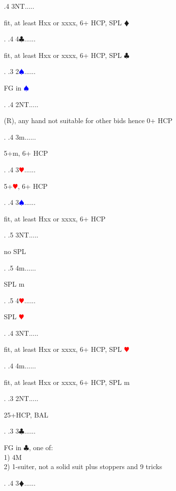\documentclass[a4paper]{article}
\newcommand{\BC}{\textcolor{OliveGreen}{$\clubsuit$}}
\newcommand{\BD}{\textcolor{RedOrange}{$\vardiamondsuit$}}
\newcommand{\BH}{\textcolor{Red}{$\varheartsuit${}}}
\newcommand{\BS}{\textcolor{Blue}{$\spadesuit${}}}
\begin{document}
{ .4 3NT.....\begin{minipage}[t]{0.8\textwidth}
fit, at least Hxx or xxxx, 6+ HCP, SPL \BD 
\end{minipage}. 
 .4 4\BC......\begin{minipage}[t]{0.8\textwidth}
fit, at least Hxx or xxxx, 6+ HCP, SPL \BC 
\end{minipage}. 
 .3 2\BS......\begin{minipage}[t]{0.8\textwidth}
FG in \BS 
\end{minipage}. 
 .4 2NT.....\begin{minipage}[t]{0.8\textwidth}
(R), any hand not suitable for other bids hence 0+ HCP
\end{minipage}. 
 .4 3m......\begin{minipage}[t]{0.8\textwidth}
5+m, 6+ HCP
\end{minipage}. 
 .4 3\BH......\begin{minipage}[t]{0.8\textwidth}
5+\BH , 6+ HCP
\end{minipage}. 
 .4 3\BS......\begin{minipage}[t]{0.8\textwidth}
fit, at least Hxx or xxxx, 6+ HCP
\end{minipage}. 
 .5 3NT.....\begin{minipage}[t]{0.8\textwidth}
no SPL
\end{minipage}. 
 .5 4m......\begin{minipage}[t]{0.8\textwidth}
SPL m
\end{minipage}. 
 .5 4\BH......\begin{minipage}[t]{0.8\textwidth}
SPL \BH 
\end{minipage}. 
 .4 3NT.....\begin{minipage}[t]{0.8\textwidth}
fit, at least Hxx or xxxx, 6+ HCP, SPL \BH 
\end{minipage}. 
 .4 4m......\begin{minipage}[t]{0.8\textwidth}
fit, at least Hxx or xxxx, 6+ HCP, SPL m
\end{minipage}. 
 .3 2NT.....\begin{minipage}[t]{0.8\textwidth}
25+HCP, BAL
\end{minipage}. 
 .3 3\BC......\begin{minipage}[t]{0.8\textwidth}
FG in \BC , one of:\\
1) 4M\\
2) 1-suiter, not a solid suit plus stoppers and 9 tricks
\end{minipage}. 
 .4 3\BD......\begin{minipage}[t]{0.8\textwidth}

\end{minipage}}
\end{document}
